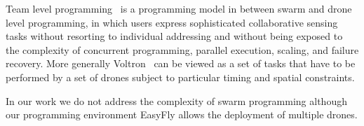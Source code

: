 Team level programming~\cite{mottola2014team} is a programming model in between swarm and drone level programming, 
in which users express sophisticated collaborative sensing tasks without resorting to individual addressing 
and without being exposed to the complexity of concurrent programming, parallel execution, scaling, and failure recovery.
More generally Voltron~\cite{mottola2014team} can be viewed as a set of tasks that have to be performed by a set of drones subject to particular timing and spatial constraints.

In our work we do not address the complexity of swarm programming although our programming environment EasyFly allows the deployment
of multiple drones. 
